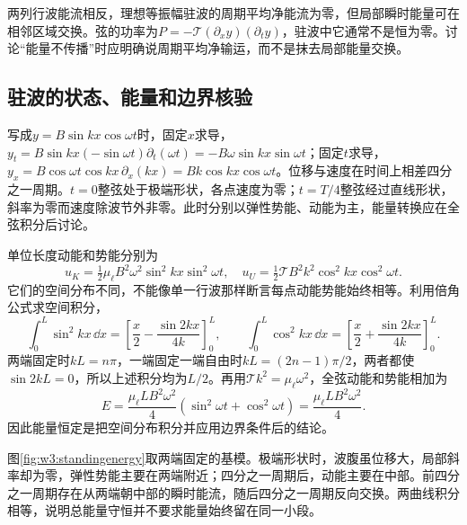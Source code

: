 两列行波能流相反，理想等振幅驻波的周期平均净能流为零，但局部瞬时能量可在相邻区域交换。弦的功率为$P=-\mathcal T(\partial_xy)(\partial_ty)$，驻波中它通常不是恒为零。讨论“能量不传播”时应明确说周期平均净输运，而不是抹去局部能量交换。

\subsection{驻波的状态、能量和边界核验}
写成$y=B\sin kx\cos\omega t$时，固定$x$求导，$y_t=B\sin kx(-\sin\omega t)\partial_t(\omega t)=-B\omega\sin kx\sin\omega t$；固定$t$求导，$y_x=B\cos\omega t\cos kx\,\partial_x(kx)=Bk\cos kx\cos\omega t$。位移与速度在时间上相差四分之一周期。$t=0$整弦处于极端形状，各点速度为零；$t=T/4$整弦经过直线形状，斜率为零而速度除波节外非零。此时分别以弹性势能、动能为主，能量转换应在全弦积分后讨论。

单位长度动能和势能分别为
\[
u_K=\tfrac12\mu_\ell B^2\omega^2\sin^2kx\sin^2\omega t,\quad
u_U=\tfrac12\mathcal T B^2k^2\cos^2kx\cos^2\omega t.
\]
它们的空间分布不同，不能像单一行波那样断言每点动能势能始终相等。利用倍角公式求空间积分，
\[
\int_0^L\sin^2kx\,\dd x
=\left[\frac x2-\frac{\sin2kx}{4k}\right]_0^L,
\qquad
\int_0^L\cos^2kx\,\dd x
=\left[\frac x2+\frac{\sin2kx}{4k}\right]_0^L.
\]
两端固定时$kL=n\pi$，一端固定一端自由时$kL=(2n-1)\pi/2$，两者都使$\sin2kL=0$，所以上述积分均为$L/2$。再用$\mathcal T k^2=\mu_\ell\omega^2$，全弦动能和势能相加为
\[
E=\frac{\mu_\ell LB^2\omega^2}{4}
(\sin^2\omega t+\cos^2\omega t)
=\frac{\mu_\ell LB^2\omega^2}{4}.
\]
因此能量恒定是把空间分布积分并应用边界条件后的结论。

图\ref{fig:w3:standingenergy}取两端固定的基模。极端形状时，波腹虽位移大，局部斜率却为零，弹性势能主要在两端附近；四分之一周期后，动能主要在中部。前四分之一周期存在从两端朝中部的瞬时能流，随后四分之一周期反向交换。两曲线积分相等，说明总能量守恒并不要求能量始终留在同一小段。


